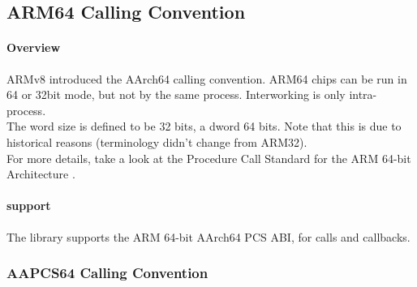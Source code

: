 %
%
%
%

\subsection{ARM64 Calling Convention}

\paragraph{Overview}

ARMv8 introduced the AArch64 calling convention. ARM64 chips can be run in 64 or 32bit mode, but not by the same process. Interworking is only intra-process.\\
The word size is defined to be 32 bits, a dword 64 bits. Note that this is due to historical reasons (terminology didn't change from ARM32).\\
For more details, take a look at the Procedure Call Standard for the ARM 64-bit Architecture \cite{AAPCS64}.\\

\paragraph{ support}

The  library supports the ARM 64-bit AArch64 PCS ABI, for calls and callbacks.

\subsubsection{AAPCS64 Calling Convention}

